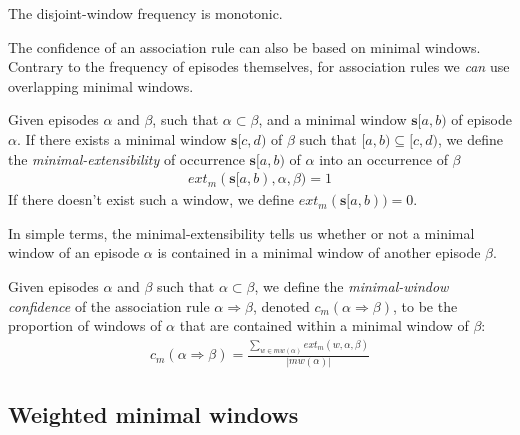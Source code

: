 The disjoint-window frequency is monotonic.

The confidence of an association rule can also be based on minimal windows. Contrary to the frequency of episodes themselves, for association rules we \emph{can} use overlapping minimal windows.

\begin{definition}
Given episodes $ \alpha $ and $ \beta $, such that $ \alpha \subset \beta $, and a minimal window $ \boldsymbol{s}[a, b) $ of episode $ \alpha $. If there exists a minimal window $ \boldsymbol{s}[c, d) $ of $ \beta $ such that
$ [a, b) \subseteq [c, d) $, we define the \emph{minimal-extensibility} of occurrence $ \boldsymbol{s}[a, b) $ of $ \alpha $ into an occurrence of $ \beta $
\begin{align*}
ext_m(\boldsymbol{s}[a, b), \alpha, \beta) = 1
\end{align*}
If there doesn't exist such a window, we define $ ext_m(\boldsymbol{s}[a,b)) = 0 $.
\end{definition}

In simple terms, the minimal-extensibility tells us whether or not a minimal window of an episode $ \alpha $ is contained in a minimal window of another episode $ \beta $.

\begin{definition}
Given episodes $ \alpha $ and $ \beta $ such that $ \alpha \subset \beta $, we define the \emph{minimal-window confidence} of the association rule $ \alpha \Rightarrow \beta $, denoted $ c_m(\alpha \Rightarrow \beta) $, to be the proportion of windows of $ \alpha $ that are contained within a minimal window of $ \beta $:
\begin{align*}
c_m(\alpha \Rightarrow \beta) = \frac{\sum_{w \in mw(\alpha)} ext_m(w, \alpha, \beta)}{| mw(\alpha) |}
\end{align*}
\end{definition}

\subsection{Weighted minimal windows}

